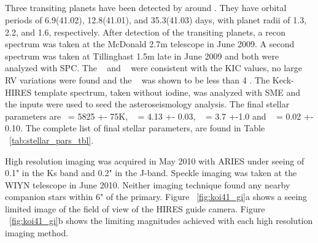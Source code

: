 \documentclass{emulateapj}
\begin{document}
\subsection{\koifourone} %
\label{sec:k41}


Three transiting planets have been detected by \ek around
 \koifourone. They have orbital periods of 6.9(41.02), 12.8(41.01), and 35.3(41.03) days,
 with planet radii of 1.3, 2.2, and 1.6\rearthe, respectively. After detection of the
 transiting planets, a recon spectrum was taken at the McDonald 2.7m
 telescope in June 2009.  A second spectrum was taken at Tillinghast
 1.5m late in June 2009 and both were analyzed with SPC. The \teff~ and \logg~
 were consistent with the KIC values, no large RV variations were
 found and the \vsini~ was shown to be less than 4 \kms.   The Keck-HIRES 
 template spectrum, taken without iodine, was analyzed
 with SME and the inputs were used to seed the asteroseismology
 analysis. The final stellar parameters are  \teff~= 5825 +- 75K, \logg~ = 4.13 +- 0.03, 
 \vsini~ = 3.7 +-1.0 \kms and \feh~ = 0.02 +- 0.10. 
 The complete list of final stellar parameters, are found in Table ~\ref{tab:stellar_pars_tbl}.
 
 High resolution imaging was acquired in May 2010 with ARIES under seeing of 0.1" in
 the Ks band and 0.2" in the J-band.  Speckle imaging was taken at the
 WIYN telescope in June 2010.  Neither imaging technique found any nearby companion
 stars within 6" of the primary. Figure ~\ref{fig:koi41_gi}a shows a seeing limited image of the field of view of the HIRES guide camera.  Figure ~\ref{fig:koi41_gi}b shows the limiting magnitudes achieved with each high resolution imaging method.  
\end{document}
